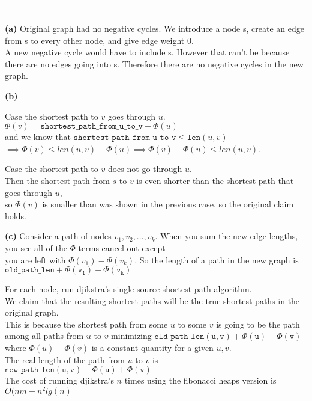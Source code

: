 \documentclass[11pt]{article}
\newcommand{\question}[2] {\vspace{.25in} \hrule\vspace{0.5em}
\noindent{\bf #1: #2} \vspace{0.5em}
\hrule \vspace{.10in}}
\renewcommand{\part}[1] {\vspace{.10in} {\bf (#1)}}
\begin{document}
\question{2}{Eliminating Negative Edges}
\part{a}
Original graph had no negative cycles. We introduce a node s, create an edge from s to every other node, and give edge weight 0.\\
A new negative cycle would have to include s. However that can't be because there are no edges going into s. Therefore there are no negative cycles in the new graph.

\part{b}

Case the shortest path to $v$ goes through $u$. \\
$\Phi(v) = \mathtt{shortest\_path\_from\_u\_to\_v} + \Phi(u)$\\
and we know that $\mathtt{shortest\_path\_from\_u\_to\_v} \leq \mathtt{len}(u,v)$\\
$\implies \Phi(v) \leq len(u,v) + \Phi(u) \implies \Phi(v) - \Phi(u) \leq len(u,v)$.

Case the shortest path to $v$ does not go through $u$. \\
Then the shortest path from $s$ to $v$ is even shorter than the shortest path that goes through $u$,\\
so $\Phi(v)$ is smaller than was shown in the previous case, so the original claim holds.


\part{c}
Consider a path of nodes $v_1, v_2, ..., v_k$. When you sum the new edge lengths, you see all of the $\Phi$ terms cancel out except\\
you are left with $\Phi(v_1) - \Phi(v_k)$. So the length of a path in the new graph is $\mathtt{old\_path\_len + \Phi(v_1) - \Phi(v_k)}$

For each node, run djikstra's single source shortest path algorithm.\\
We claim that the resulting shortest paths will be the true shortest paths in the original graph.\\
This is because the shortest path from some $u$ to some $v$ is going to be the path among all paths from $u$ to $v$ minimizing $\mathtt{old\_path\_len(u,v) + \Phi(u) - \Phi(v)}$ where $\Phi(u) - \Phi(v)$ is a constant quantity for a given $u,v$.\\
The real length of the path from $u$ to $v$ is $\mathtt{new\_path\_len(u,v) - \Phi(u) + \Phi(v)}$\\
The cost of running djikstra's $n$ times using the fibonacci heaps version is $O(nm + n^2lg(n)$
\end{document}
